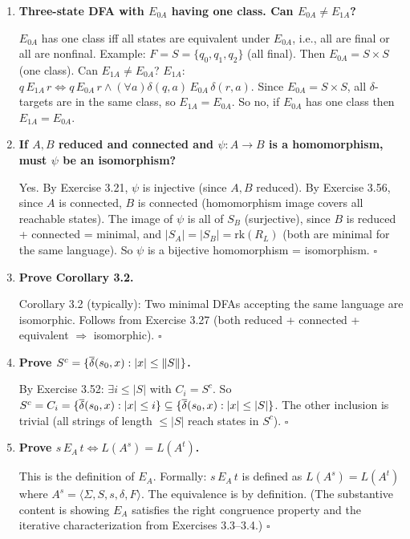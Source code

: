 \begin{enumerate}[{3.}1.]
\item \textbf{Three-state DFA with $E_{0A}$ having one class. Can $E_{0A}\neq E_{1A}$?}

$E_{0A}$ has one class iff all states are equivalent under $E_{0A}$, i.e., all are final or all are nonfinal. Example: $F=S=\{q_0,q_1,q_2\}$ (all final). Then $E_{0A}=S\times S$ (one class). Can $E_{1A}\neq E_{0A}$? $E_{1A}$: $q\,E_{1A}\,r\Leftrightarrow q\,E_{0A}\,r\wedge(\forall a)\delta(q,a)\,E_{0A}\,\delta(r,a)$. Since $E_{0A}=S\times S$, all $\delta$-targets are in the same class, so $E_{1A}=E_{0A}$. So no, if $E_{0A}$ has one class then $E_{1A}=E_{0A}$.

\item \textbf{If $A,B$ reduced and connected and $\psi: A\to B$ is a homomorphism, must $\psi$ be an isomorphism?}

Yes. By Exercise 3.21, $\psi$ is injective (since $A,B$ reduced). By Exercise 3.56, since $A$ is connected, $B$ is connected (homomorphism image covers all reachable states). The image of $\psi$ is all of $S_B$ (surjective), since $B$ is reduced + connected = minimal, and $|S_A|=|S_B|=\mathrm{rk}(R_L)$ (both are minimal for the same language). So $\psi$ is a bijective homomorphism = isomorphism. $\square$

\item \textbf{Prove Corollary 3.2.}

Corollary 3.2 (typically): Two minimal DFAs accepting the same language are isomorphic. Follows from Exercise 3.27 (both reduced + connected + equivalent $\Rightarrow$ isomorphic). $\square$

\item \textbf{Prove $S^c=\{\overline{\delta}(s_0,x):|x|\leq\|S\|\}$.}

By Exercise 3.52: $\exists i\leq|S|$ with $C_i=S^c$. So $S^c=C_i=\{\overline{\delta}(s_0,x):|x|\leq i\}\subseteq\{\overline{\delta}(s_0,x):|x|\leq|S|\}$. The other inclusion is trivial (all strings of length $\leq|S|$ reach states in $S^c$). $\square$

\item \textbf{Prove $s\,E_A\,t\Leftrightarrow L(A^s)=L(A^t)$.}

This is the definition of $E_A$. Formally: $s\,E_A\,t$ is defined as $L(A^s)=L(A^t)$ where $A^s=\langle\Sigma,S,s,\delta,F\rangle$. The equivalence is by definition. (The substantive content is showing $E_A$ satisfies the right congruence property and the iterative characterization from Exercises 3.3--3.4.) $\square$


\end{enumerate}
